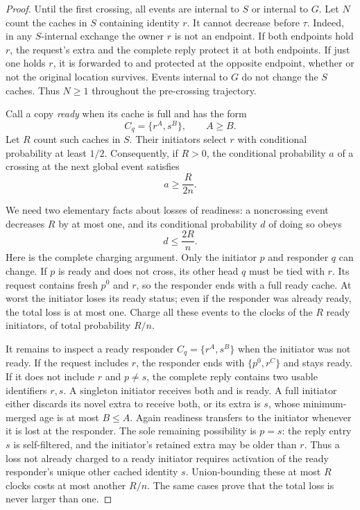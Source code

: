 \documentclass[11pt]{article}
\begin{document}
\begin{proof}
Until the first crossing, all events are internal to
$S$ or internal to $G$. Let $N$ count the caches in
$S$ containing identity $r$. It cannot decrease before
$\tau$. Indeed, in any $S$-internal exchange the owner
$r$ is not an endpoint. If both endpoints hold $r$,
the request's extra and the complete reply protect it
at both endpoints. If just one holds $r$, it is
forwarded to and protected at the opposite endpoint,
whether or not the original location survives.
Events internal to $G$ do not change the $S$ caches.
Thus $N\ge1$ throughout the pre-crossing trajectory.

Call a copy \emph{ready} when its cache is full and
has the form
\[
 C_q=\{r^A,s^B\},\qquad A\ge B.
\]
Let $R$ count such caches in $S$. Their initiators
select $r$ with conditional probability at least
$1/2$. Consequently, if $R>0$, the conditional
probability $a$ of a crossing at the next global
event satisfies
\[
 a\ge\frac{R}{2n}.
\]

We need two elementary facts about losses of readiness:
a noncrossing event decreases $R$ by at most one,
and its conditional probability $d$ of doing so obeys
\[
 d\le\frac{2R}{n}.
\]
Here is the complete charging argument. Only the
initiator $p$ and responder $q$ can change.
If $p$ is ready and does not cross, its other head
$q$ must be tied with $r$. Its request contains
fresh $p^0$ and $r$, so the responder ends with
a full ready cache. At worst the initiator loses
its ready status; even if the responder was already
ready, the total loss is at most one.
Charge all these events to the clocks of the
$R$ ready initiators, of total probability $R/n$.

It remains to inspect a ready responder
$C_q=\{r^A,s^B\}$ when the initiator was not ready.
If the request includes $r$, the responder ends
with $\{p^0,r^C\}$ and stays ready.
If it does not include $r$ and $p\ne s$, the
complete reply contains two usable identifiers
$r,s$. A singleton initiator receives both and
is ready. A full initiator either discards its
novel extra to receive both, or its extra is
$s$, whose minimum-merged age is at most
$B\le A$. Again readiness transfers to the
initiator whenever it is lost at the responder.
The sole remaining possibility is $p=s$:
the reply entry $s$ is self-filtered, and the
initiator's retained extra may be older than $r$.
Thus a loss not already charged to a ready
initiator requires activation of the ready
responder's unique other cached identity $s$.
Union-bounding these at most $R$ clocks costs
at most another $R/n$. The same cases prove
that the total loss is never larger than one.


\end{proof}
\end{document}
